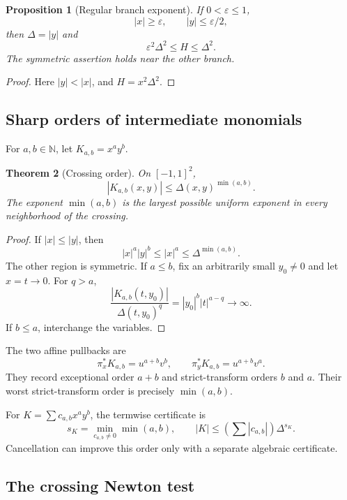 \documentclass[11pt]{article}
\newtheorem{theorem}{Theorem}[section]
\newtheorem{proposition}[theorem]{Proposition}
\theoremstyle{remark}
\begin{document}
\begin{proposition}[Regular branch exponent]
\label{prop:v17v11-branch}
If \(0<\varepsilon\leq1\),
\[
 |x|\geq\varepsilon,\qquad |y|\leq\varepsilon/2,
\]
then \(\Delta=|y|\) and
\[
 \varepsilon^2\Delta^2\leq H\leq\Delta^2.          \tag{11.8}
\]
The symmetric assertion holds near the other branch.
\end{proposition}

\begin{proof}
Here \(|y|<|x|\), and \(H=x^2\Delta^2\).
\end{proof}

\subsection{Sharp orders of intermediate monomials}

For \(a,b\in\mathbb N\), let \(K_{a,b}=x^ay^b\).

\begin{theorem}[Crossing order]
\label{thm:v17v11-monomial-order}
On \([-1,1]^2\),
\[
 |K_{a,b}(x,y)|
 \leq\Delta(x,y)^{\min(a,b)}.                     \tag{11.9}
\]
The exponent \(\min(a,b)\) is the largest possible uniform exponent
in every neighborhood of the crossing.
\end{theorem}

\begin{proof}
If \(|x|\leq|y|\), then
\[
 |x|^a|y|^b\leq|x|^a
 \leq\Delta^{\min(a,b)}.
\]
The other region is symmetric.  If \(a\leq b\), fix an arbitrarily
small \(y_0\ne0\) and let \(x=t\to0\).  For \(q>a\),
\[
 \frac{|K_{a,b}(t,y_0)|}{\Delta(t,y_0)^q}
 =|y_0|^b|t|^{a-q}\longrightarrow\infty.
\]
If \(b\leq a\), interchange the variables.
\end{proof}

The two affine pullbacks are
\[
 \pi_x^*K_{a,b}=u^{a+b}v^b,\qquad
 \pi_y^*K_{a,b}=u^{a+b}v^a.                       \tag{11.10}
\]
They record exceptional order \(a+b\) and strict-transform orders
\(b\) and \(a\).  Their worst strict-transform order is precisely
\(\min(a,b)\).

For \(K=\sum c_{a,b}x^ay^b\), the termwise certificate is
\[
 s_K=\min_{c_{a,b}\ne0}\min(a,b),\qquad
 |K|\leq
 \left(\sum|c_{a,b}|\right)\Delta^{s_K}.           \tag{11.11}
\]
Cancellation can improve this order only with a separate algebraic
certificate.

\subsection{The crossing Newton test}
\end{document}
